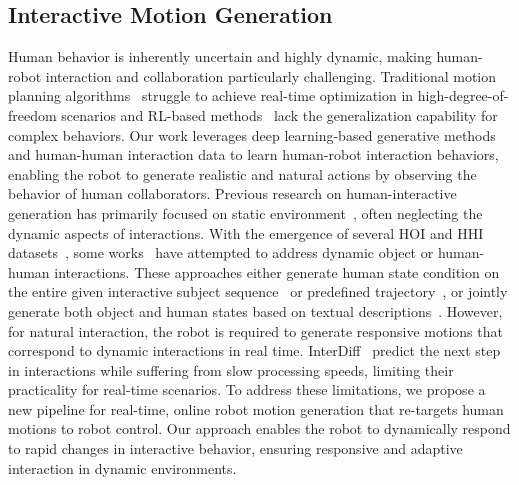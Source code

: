 \subsection{Interactive Motion Generation} 
Human behavior is inherently uncertain and highly dynamic, making human-robot interaction and collaboration particularly challenging. Traditional motion planning algorithms~\cite{dai2014whole} struggle to achieve real-time optimization in high-degree-of-freedom scenarios and RL-based methods~\cite{hwangbo2019learning} lack the generalization capability for complex behaviors. Our work leverages deep learning-based generative methods and human-human interaction data to learn human-robot interaction behaviors, enabling the robot to generate realistic and natural actions by observing the behavior of human collaborators.
Previous research on human-interactive generation has primarily focused on static environment~\cite{jiang2022chairs,kulkarni2024nifty,jiang2023full}, often neglecting the dynamic aspects of interactions.
With the emergence of several HOI and HHI datasets~\cite{li2023object,bhatnagar2022behave,liang2024intergen}, some works~\cite{li2023object,peng2023hoi,xu2023interdiff,li2023controllable,xu2024regennet} have attempted to address dynamic object or human-human interactions.
These approaches either generate human state condition on the entire given interactive subject sequence~\cite{li2023object,xu2024regennet} or predefined trajectory~\cite{li2023controllable}, or jointly generate both object and human states based on textual descriptions~\cite{peng2023hoi,diller2024cg,wu2024thor,xu2023interdiff}. 
However, for natural interaction, the robot is required to generate responsive motions that correspond to dynamic interactions in real time. 
InterDiff~\cite{xu2023interdiff} %
predict the next step in interactions while suffering from slow processing speeds, limiting their practicality for real-time scenarios. 
To address these limitations, we propose a new pipeline for real-time, online robot motion generation that re-targets human motions to robot control. Our approach enables the robot to dynamically respond to rapid changes in interactive behavior, ensuring responsive and adaptive interaction in dynamic environments.

